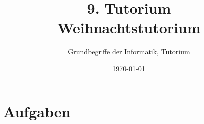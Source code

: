 




\title[Weihnachtstutorium]{9. Tutorium\\ Weihnachtstutorium}
\subtitle{Grundbegriffe der Informatik, Tutorium \hashtag\mytutnumber}
\date{\today}


\titleframe
\roadmap


\section{Aufgaben}



\section{}
\questionframe
{}
